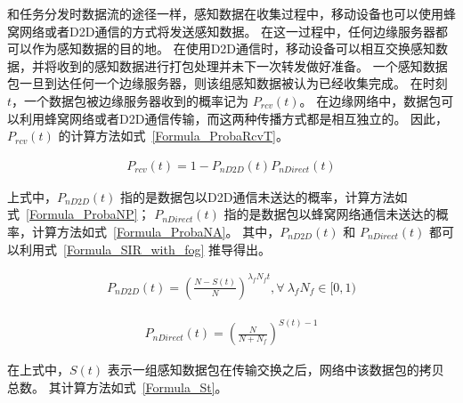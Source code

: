 
和任务分发时数据流的途径一样，感知数据在收集过程中，移动设备也可以使用蜂窝网络或者D2D通信的方式将发送感知数据。
在这一过程中，任何边缘服务器都可以作为感知数据的目的地。
在使用D2D通信时，移动设备可以相互交换感知数据，并将收到的感知数据进行打包处理并未下一次转发做好准备。
一个感知数据包一旦到达任何一个边缘服务器，则该组感知数据被认为已经收集完成。
在时刻 $t$，一个数据包被边缘服务器收到的概率记为 $P_{rcv}(t)$。
在边缘网络中，数据包可以利用蜂窝网络或者D2D通信传输，而这两种传播方式都是相互独立的。
因此，$P_{rcv}(t)$ 的计算方法如式~\eqref{Formula_ProbaRcvT}。

\begin{equation}
\label{Formula_ProbaRcvT}
\begin{aligned}
P_{rcv}(t) = 1 - P_{nD2D}(t) P_{nDirect}(t)
\end{aligned}
\end{equation}

上式中，$P_{nD2D}(t)$ 指的是数据包以D2D通信未送达的概率，计算方法如式~\eqref{Formula_ProbaNP}；
$P_{nDirect}(t)$ 指的是数据包以蜂窝网络通信未送达的概率，计算方法如式~\eqref{Formula_ProbaNA}。
其中，$P_{nD2D}(t)$ 和 $P_{nDirect}(t)$ 都可以利用式~\eqref{Formula_SIR_with_fog} 推导得出。


\begin{equation}
  \label{Formula_ProbaNP}
  \begin{aligned}
  P_{nD2D}(t) = (\frac{N-S(t)}{N})^{\lambda_f N_f t}, \forall \ \lambda_f N_f \in [0,1)
  \end{aligned}
\end{equation}

\begin{equation}
  \label{Formula_ProbaNA}
  \begin{aligned}
  P_{nDirect}(t) = (\frac{N}{N + N_f})^{S(t)-1}
  \end{aligned}
\end{equation}

在上式中，$S(t)$ 表示一组感知数据包在传输交换之后，网络中该数据包的拷贝总数。
其计算方法如式~\eqref{Formula_St}。

